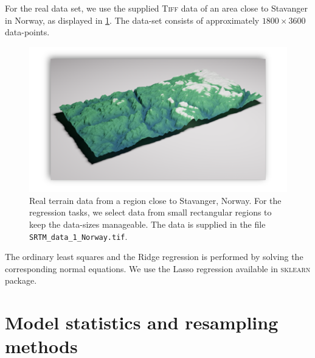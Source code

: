 \documentclass[dvipsnames, article, a4paper, oneside, 12pt]{memoir}
\begin{document}
  For the real data set, we use the supplied \textsc{Tiff} data of an area
  close to Stavanger in Norway, as displayed in \cref{fig:terrain}. The
  data-set consists of approximately \( 1800 \times 3600 \) data-points. 
  \begin{figure}
    \centering
    \includegraphics[width=1\linewidth]{images/terrain.pdf}
    \caption{Real terrain data from a region close to Stavanger, Norway. For
    the regression tasks, we select data from small rectangular regions to keep
    the data-sizes manageable. The data is supplied in the file
    \texttt{SRTM\_data\_1\_Norway.tif}.}
  \label{fig:terrain}
  \end{figure}

  The ordinary least squares and the Ridge regression is performed by solving
  the corresponding normal equations. We use the Lasso regression available in
  \textsc{sklearn} package.

  \section{Model statistics and resampling methods}
 	
\end{document}
